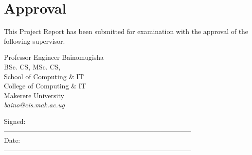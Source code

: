 \chapter*{Approval}
This Project Report has been submitted for examination with the approval of the following supervisor.

\vspace{2.0em}

\noindent
Professor Engineer Bainomugisha \\
BSc. CS, MSc. CS,\\
School of Computing \& IT\\
College of Computing \& IT\\
Makerere University\\
\emph{baino@cis.mak.ac.ug}

\vspace{1.0em}
\noindent
Signed:\\
\tab -----------------------------------------------------------------------------------\\
Date:\\
\tab -----------------------------------------------------------------------------------\\

\newpage